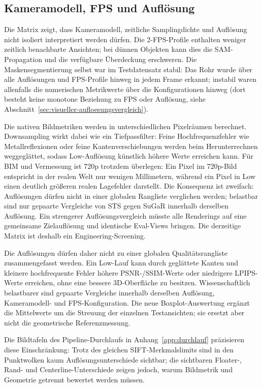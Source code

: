 \subsection{Kameramodell, FPS und Auflösung}

Die Matrix zeigt, dass Kameramodell, zeitliche Samplingdichte und Auflösung
nicht isoliert interpretiert werden dürfen. Die 2-FPS-Profile enthalten weniger
zeitlich benachbarte Ansichten; bei dünnen Objekten kann dies die SAM-
Propagation und die verfügbare Überdeckung erschweren. Die Maskensegmentierung
selbst war im Testdatensatz stabil: Das Rohr wurde über alle Auflösungen und
FPS-Profile hinweg in jedem Frame erkannt; instabil waren allenfalls die
numerischen Metrikwerte über die Konfigurationen hinweg (dort besteht keine
monotone Beziehung zu FPS oder Auflösung, siehe
Abschnitt~\ref{sec:visueller-aufloesungsvergleich}).

Die nativen Bildmetriken werden in unterschiedlichen Pixelräumen berechnet.
Downsampling wirkt dabei wie ein Tiefpassfilter: Feine Hochfrequenzfehler wie
Metallreflexionen oder feine Kantenverschiebungen werden beim Herunterrechnen
weggeglättet, sodass Low-Auflösung künstlich höhere Werte erreichen kann. Für
BIM und Vermessung ist 720p trotzdem überlegen: Ein Pixel im 720p-Bild
entspricht in der realen Welt nur wenigen Millimetern, während ein Pixel in
Low einen deutlich größeren realen Lagefehler darstellt. Die Konsequenz ist
zweifach: Auflösungen dürfen nicht in einer globalen Rangliste verglichen
werden; belastbar sind nur gepaarte Vergleiche von STS gegen SuGaR innerhalb
derselben Auflösung. Ein strengerer
Auflösungsvergleich müsste alle Renderings auf eine gemeinsame Zielauflösung
und identische Eval-Views bringen. Die derzeitige Matrix ist deshalb ein
Engineering-Screening.

Die Auflösungen dürfen daher nicht zu einer globalen Qualitätsrangliste
zusammengefasst werden. Ein Low-Lauf kann durch geglättete Kanten und kleinere
hochfrequente Fehler höhere PSNR-/SSIM-Werte oder niedrigere LPIPS-Werte
erreichen, ohne eine bessere 3D-Oberfläche zu besitzen. Wissenschaftlich
belastbarer sind gepaarte Vergleiche innerhalb derselben Auflösung,
Kameramodell- und FPS-Konfiguration. Die neue Boxplot-Auswertung ergänzt die
Mittelwerte um die Streuung der einzelnen Testansichten; sie ersetzt aber
nicht die geometrische Referenzmessung.

Die Bildtafeln des Pipeline-Durchlaufs in
Anhang~\ref{app:durchlauf} präzisieren diese Einschränkung: Trotz des gleichen
SIFT-Merkmalslimits sind in den Punktwolken kaum Auflösungsunterschiede
sichtbar; die sichtbaren Floater-, Rand- und Centerline-Unterschiede zeigen
jedoch, warum Bildmetrik und Geometrie getrennt bewertet werden müssen.

